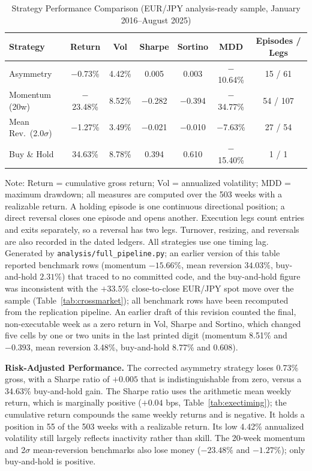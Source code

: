 \documentclass[11pt]{article}
\begin{document}
\begin{table}[H]
\centering
\caption{Strategy Performance Comparison (EUR/JPY analysis-ready sample, January 2016--August 2025)}
\label{tab:backtest}
\small
\begin{tabular}{@{}lcccccc@{}}
\toprule
Strategy & Return & Vol & Sharpe & Sortino & MDD & Episodes / Legs \\
\midrule
Asymmetry & $-$0.73\% & 4.42\% & 0.005 & 0.003 & $-$10.64\% & 15 / 61 \\
Momentum (20w) & $-$23.48\% & 8.52\% & $-$0.282 & $-$0.394 & $-$34.77\% & 54 / 107 \\
Mean Rev.\ (2.0$\sigma$) & $-$1.27\% & 3.49\% & $-$0.021 & $-$0.010 & $-$7.63\% & 27 / 54 \\
Buy \& Hold & 34.63\% & 8.78\% & 0.394 & 0.610 & $-$15.40\% & 1 / 1 \\
\bottomrule
\end{tabular}
\par\vspace{0.3em}
\parbox{\linewidth}{\footnotesize Note: Return = cumulative gross return; Vol = annualized volatility; MDD = maximum drawdown; all measures are computed over the 503 weeks with a realizable return. A holding episode is one continuous directional position; a direct reversal closes one episode and opens another. Execution legs count entries and exits separately, so a reversal has two legs. Turnover, resizing, and reversals are also recorded in the dated ledgers. All strategies use one timing lag. Generated by \texttt{analysis/full\_pipeline.py}; an earlier version of this table reported benchmark rows (momentum $-15.66\%$, mean reversion $34.03\%$, buy-and-hold $2.31\%$) that traced to no committed code, and the buy-and-hold figure was inconsistent with the $+33.5\%$ close-to-close EUR/JPY spot move over the sample (Table~\ref{tab:crossmarket}); all benchmark rows have been recomputed from the replication pipeline. An earlier draft of this revision counted the final, non-executable week as a zero return in Vol, Sharpe and Sortino, which changed five cells by one or two units in the last printed digit (momentum 8.51\% and $-0.393$, mean reversion 3.48\%, buy-and-hold 8.77\% and 0.608).}
\end{table}

\textbf{Risk-Adjusted Performance.} The corrected asymmetry strategy loses 0.73\% gross, with a Sharpe ratio of $+0.005$ that is indistinguishable from zero, versus a 34.63\% buy-and-hold gain. The Sharpe ratio uses the arithmetic mean weekly return, which is marginally positive ($+0.04$ bps, Table~\ref{tab:exectiming}); the cumulative return compounds the same weekly returns and is negative. It holds a position in 55 of the 503 weeks with a realizable return. Its low 4.42\% annualized volatility still largely reflects inactivity rather than skill. The 20-week momentum and 2$\sigma$ mean-reversion benchmarks also lose money ($-23.48\%$ and $-1.27\%$); only buy-and-hold is positive.
\end{document}
